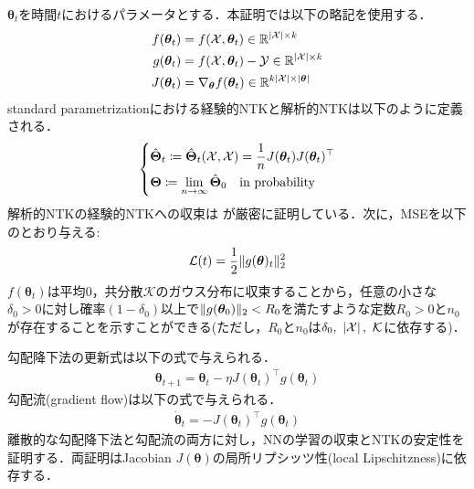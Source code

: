 $\bm{\theta}_t$を時間$t$におけるパラメータとする．本証明では以下の略記を使用する．
\begin{align}
    f(\bm{\theta}_t) &= f(\mathcal{X}, \bm{\theta}_t) \in \mathbb{R}^{\left|\mathcal{X}\right| \times k} \\
    g(\bm{\theta}_t) &= f(\mathcal{X}, \bm{\theta}_t) - \mathcal{Y} \in \mathbb{R}^{\left|\mathcal{X}\right| \times k} \\
    J(\bm{\theta}_t) &= \nabla_{\bm{\theta}}f(\bm{\theta}_t) \in \mathbb{R}^{k\left|\mathcal{X}\right| \times \left|\bm{\theta}\right|}
\end{align}
standard parametrizationにおける経験的NTKと解析的NTKは以下のように定義される．
\begin{align}
    \begin{dcases}
        \hat{\bm{\Theta}}_t \coloneqq \hat{\bm{\Theta}}_t(\mathcal{X}, \mathcal{X}) = \dfrac{1}{n} J(\bm{\theta}_t)J(\bm{\theta}_t)^\top \\
        \bm{\Theta} \coloneqq \lim_{n \rightarrow \infty} \hat{\bm{\Theta}}_0 \quad \mbox{in probability}
    \end{dcases}
\end{align}
解析的NTKの経験的NTKへの収束は \citet{yang2019scaling} が厳密に証明している．次に，MSEを以下のとおり与える:
\begin{align}
    \mathcal{L}(t) = \dfrac{1}{2}\|g(\bm{\theta})_t\|_2^2
\end{align}
$f(\bm{\theta}_t)$は平均$0$，共分散$\mathcal{K}$のガウス分布に収束することから，任意の小さな$\delta_0 > 0$に対し確率$(1 - \delta_0)$以上で$\|g(\bm{\theta}_0)\|_2 < R_0$を満たすような定数$R_0 > 0$と$n_0$が存在することを示すことができる(ただし，$R_0$と$n_0$は$\delta_0, \ \verbar{\mathcal{X}}, \ \mathcal{K}$に依存する)．

勾配降下法の更新式は以下の式で与えられる．
\begin{align}
    \bm{\theta}_{t+1} = \bm{\theta}_t - \eta J(\bm{\theta}_t)^\top g(\bm{\theta}_t)
\end{align}
勾配流(gradient flow)は以下の式で与えられる．
\begin{align}
    \dot{\bm{\theta}}_t = -J(\bm{\theta}_t)^\top g(\bm{\theta}_t)
\end{align}
離散的な勾配降下法と勾配流の両方に対し，NNの学習の収束とNTKの安定性を証明する．両証明はJacobian $J(\bm{\theta})$の局所リプシッツ性(local Lipschitzness)に依存する．

